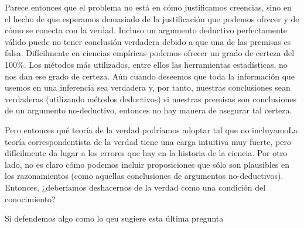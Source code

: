Parece entonces que el problema no está en cómo justificamos creencias, sino en el hecho de que esperamos demasiado de la justificación que podemos ofrecer y de cómo se conecta con la verdad. Incluso un argumento deductivo perfectamente válido puede no tener conclusión verdadera debido a que una de las premisas es falsa. Difícilmente en ciencias empíricas podemos ofrecer un grado de certeza del 100\%. Los métodos más utilizados, entre ellos las herramientas estadísticas, no nos dan ese grado de certeza. Aún cuando deseemos que toda la información que usemos en una inferencia sea verdadera y, por tanto, nuestras conclusiones sean verdaderas (utilizando métodos deductivos) si nuestras premisas son conclusiones de un argumento no-deductivo, entonces no hay manera de asegurar tal certeza.


Pero entonces qué teoría de la verdad podríamos adoptar tal que no incluyamoLa teoría correspondentista de la verdad tiene una carga intuitiva muy fuerte, pero difícilmente da lugar a los errores que hay en la historia de la ciencia. Por otro lado, no es claro cómo podemos incluir proposiciones que sólo son plausibles en los razonamientos (como aquellas conclusiones de argumentos no-deductivos). Entonces, ¿deberíamos deshacernos de la verdad como una condición del conocimiento?

Si defendemos algo como lo qeu sugiere esta última pregunta


